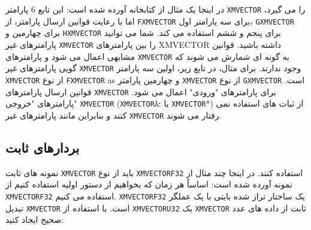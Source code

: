 {\begin{spacing}{1.5}
        در اینجا یک مثال از کتابخانه  آورده شده است:
        \textbf{\vspace{6pt}}
        \lr{}
        \textbf{\vspace{6pt}}
        این تابع 6 پارامتر \texttt{XMVECTOR} را می گیرد، اما با رعایت قوانین ارسال پارامتر، از \texttt{FXMVECTOR} برای سه پارامتر اول، \texttt{GXMVECTOR} برای چهارمین و \texttt{HXMVECTOR} برای پنجم و ششم استفاده می کند.
        شما می توانید پارامترهای غیر \texttt{XMVECTOR} را بین پارامترهای XMVECTOR داشته باشید.
        قوانین مشابهی اعمال می شود و پارامترهای \texttt{XMVECTOR} به گونه ای شمارش می شوند که گویی پارامترهای غیر \texttt{XMVECTOR} وجود ندارند.
        برای مثال، در تابع زیر، اولین سه پارامتر \texttt{XMVECTOR} از نوع \texttt{FXMVECTOR} as و چهارمین پارامتر \texttt{XMVECTOR} از نوع \texttt{GXMVECTOR} است.
        \textbf{\vspace{6pt}}
        \lr{}
        \textbf{\vspace{6pt}}
        قوانین ارسال پارامترهای \texttt{XMVECTOR} برای پارامترهای "ورودی" اعمال می شود.
        پارامترهای "خروجی" \texttt{XMVECTOR} (\texttt{XMVECTOR}\& یا \texttt{XMVECTOR}*) از ثبات های  استفاده نمی کنند و بنابراین مانند پارامترهای غیر \texttt{XMVECTOR} رفتار می شوند.
    \end{spacing}
}

\subsection{\textbf{بردارهای ثابت}}
{
    \Large
    \begin{spacing}{1.5}
        نمونه های ثابت \texttt{XMVECTOR} باید از نوع \texttt{XMVECTORF32} استفاده کنند. در اینجا چند مثال از نمونه  آورده شده است:
        \textbf{\vspace{6pt}}
        \lr{}
        \textbf{\vspace{6pt}}
        اساساً هر زمان که بخواهیم از دستور اولیه استفاده کنیم از \texttt{XMVECTORF32} استفاده می کنیم.
        \texttt{XMVECTORF32} یک ساختار تراز شده  بایتی با یک عملگر تبدیل \texttt{XMVECTOR} است.
        \textbf{\vspace{6pt}}
        \lr{}
        \textbf{\vspace{6pt}}
        با استفاده از \texttt{XMVECTORU32} یک \texttt{XMVECTOR} ثابت از داده های عدد صحیح ایجاد کنید:
        \textbf{\vspace{6pt}}
        \lr{}
    \end{spacing}
}

